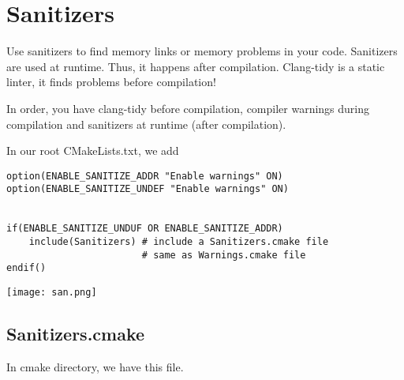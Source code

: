 \documentclass[openany]{report}
\begin{document}
\section{Sanitizers}

Use sanitizers to find memory links or memory problems in your code. Sanitizers are used at runtime. 
Thus, it happens after compilation. Clang-tidy is a static linter, it finds problems before compilation!  

In order, you have clang-tidy before compilation, 
compiler warnings during compilation and sanitizers at runtime (after compilation).

In our root CMakeLists.txt, we add

\begin{verbatim}
option(ENABLE_SANITIZE_ADDR "Enable warnings" ON)
option(ENABLE_SANITIZE_UNDEF "Enable warnings" ON)


if(ENABLE_SANITIZE_UNDUF OR ENABLE_SANITIZE_ADDR)
    include(Sanitizers) # include a Sanitizers.cmake file
                        # same as Warnings.cmake file
endif()

\end{verbatim}

\begin{center}
    \texttt{[image: san.png]}
\end{center}


\subsection{Sanitizers.cmake}

In cmake directory, we have this file.
\end{document}

